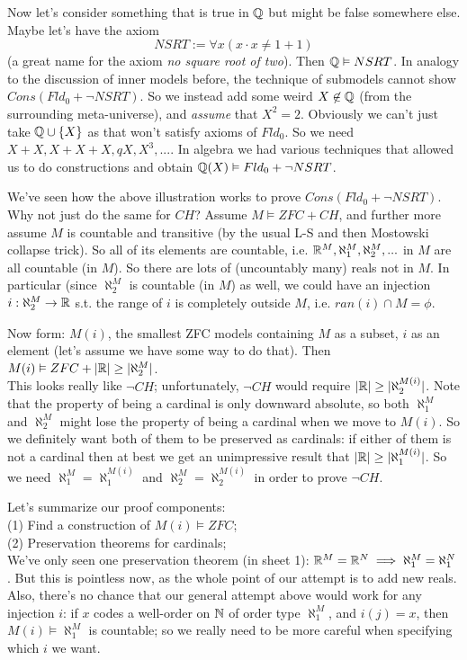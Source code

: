 \documentclass[a4paper]{article}
\begin{document}
Now let's consider something that is true in $\mathbb{Q}$ but might be false somewhere else. Maybe let's have the axiom
\[
NSRT := \forall x (x \cdot x \neq 1+1)
\]
(a great name for the axiom \emph{no square root of two}). Then $\mathbb{Q} \vDash NSRT$. In analogy to the discussion of inner models before, the technique of submodels cannot show $Cons(Fld_0+\neg NSRT)$. So we instead add some weird $X \not\in \mathbb{Q}$ (from the surrounding meta-universe), and \emph{assume} that $X^2=2$. Obviously we can't just take $\mathbb{Q} \cup \{X\}$ as that won't satisfy axioms of $Fld_0$. So we need $X+X,X+X+X,qX,X^3,...$. In algebra we had various techniques that allowed us to do constructions and obtain $\mathbb{Q}(X) \vDash Fld_0+\neg NSRT$.

We've seen how the above illustration works to prove $Cons(Fld_0+\neg NSRT)$. Why not just do the same for $CH$? Assume $M \vDash ZFC+CH$, and further more assume $M$ is countable and transitive (by the usual L-S and then Mostowski collapse trick). So all of its elements are countable, i.e. $\mathbb{R}^M,\aleph_1^M,\aleph_2^M,...$ in $M$ are all countable (in $M$). So there are lots of (uncountably many) reals not in $M$. In particular (since $\aleph_2^M$ is countable (in $M$) as well, we could have an injection $i: \aleph_2^M \to \mathbb{R}$ s.t. the range of $i$ is completely outside $M$, i.e. $ran(i) \cap M = \phi$.

Now form: $M(i)$, the smallest ZFC models containing $M$ as a subset, $i$ as an element (let's assume we have some way to do that). Then $M(i) \vDash ZFC+|\mathbb{R}| \geq |\aleph_2^M|$.\\
This looks really like $\neg CH$; unfortunately, $\neg CH$ would require $|\mathbb{R}| \geq |\aleph_2^{M(i)}|$. Note that the property of being a cardinal is only downward absolute, so both $\aleph_1^M$ and $\aleph_2^M$ might lose the property of being a cardinal when we move to $M(i)$. So we definitely want both of them to be preserved as cardinals: if either of them is not a cardinal then at best we get an unimpressive result that $|\mathbb{R}| \geq |\aleph_1^{M(i)}|$. So we need $\aleph_1^M = \aleph_1^{M(i)}$ and $\aleph_2^M = \aleph_2^{M(i)}$ in order to prove $\neg CH$.

Let's summarize our proof components:\\
(1) Find a construction of $M(i) \vDash ZFC$;\\
(2) Preservation theorems for cardinals;\\
We've only seen one preservation theorem (in sheet 1): $\mathbb{R}^M = \mathbb{R}^N \implies \aleph_1^M = \aleph_1^N$. But this is pointless now, as the whole point of our attempt is to add new reals.\\
Also, there's no chance that our general attempt above would work for any injection $i$: if $x$ codes a well-order on $\mathbb{N}$ of order type $\aleph_1^M$, and $i(j) = x$, then $M(i) \vDash \aleph_1^M$ is countable; so we really need to be more careful when specifying which $i$ we want.
\end{document}
